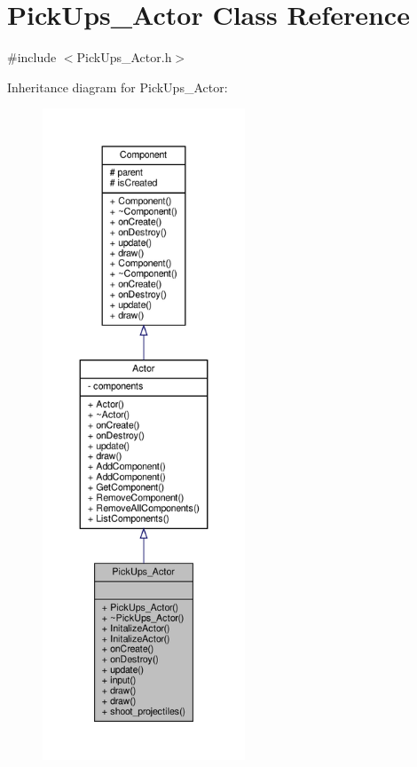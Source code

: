 \hypertarget{classPickUps__Actor}{}\section{Pick\+Ups\+\_\+\+Actor Class Reference}
\label{classPickUps__Actor}


{\ttfamily \#include $<$Pick\+Ups\+\_\+\+Actor.\+h$>$}



Inheritance diagram for Pick\+Ups\+\_\+\+Actor\+:
\nopagebreak
\begin{figure}[H]
\begin{center}
\leavevmode
\includegraphics[height=550pt]{classPickUps__Actor__inherit__graph}
\end{center}
\end{figure}


